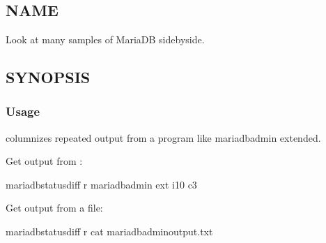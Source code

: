 \documentclass[letterpaper,10pt,english]{sphinxmanual}
\begin{document}
\chapter{}
\label{\detokenize{mariadb-status-diff:mariadb-status-diff}}\label{\detokenize{mariadb-status-diff::doc}}

\section{NAME}
\label{\detokenize{mariadb-status-diff:name}}
 \sphinxhyphen{} Look at many samples of MariaDB  side\sphinxhyphen{}by\sphinxhyphen{}side.


\section{SYNOPSIS}
\label{\detokenize{mariadb-status-diff:synopsis}}

\subsection{Usage}
\label{\detokenize{mariadb-status-diff:usage}}
\begin{sphinxVerbatim}[commandchars=\\\{\}]
 \PYG{p}{[}\PYG{p}{]}  
\end{sphinxVerbatim}

 columnizes repeated output from a program like mariadb\sphinxhyphen{}admin extended.

Get output from :

\begin{sphinxVerbatim}[commandchars=\\\{\}]
mariadb\PYGZhy{}status\PYGZhy{}diff \PYGZhy{}r \PYGZhy{}\PYGZhy{} mariadb\PYGZhy{}admin ext \PYGZhy{}i10 \PYGZhy{}c3
\end{sphinxVerbatim}

Get output from a file:

\begin{sphinxVerbatim}[commandchars=\\\{\}]
mariadb\PYGZhy{}status\PYGZhy{}diff \PYGZhy{}r \PYGZhy{}\PYGZhy{} cat mariadb\PYGZhy{}admin\PYGZhy{}output.txt
\end{sphinxVerbatim}
\end{document}
